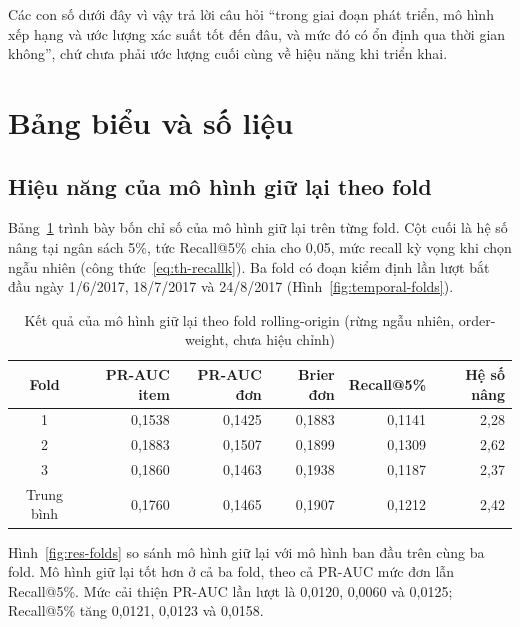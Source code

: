\documentclass[12pt,a4paper]{report}
\begin{document}
Các con số dưới đây vì vậy trả lời câu hỏi ``trong giai đoạn phát triển, mô hình xếp hạng và ước lượng xác suất tốt đến đâu, và mức đó có ổn định qua thời gian không'', chứ chưa phải ước lượng cuối cùng về hiệu năng khi triển khai.

\section{Bảng biểu và số liệu}\label{sec:tables}

\subsection{Hiệu năng của mô hình giữ lại theo fold}\label{subsec:tab-folds}

Bảng~\ref{tab:res-folds} trình bày bốn chỉ số của mô hình giữ lại trên từng fold. Cột cuối là hệ số nâng tại ngân sách 5\%, tức Recall@5\% chia cho 0,05, mức recall kỳ vọng khi chọn ngẫu nhiên (công thức~\eqref{eq:th-recallk}). Ba fold có đoạn kiểm định lần lượt bắt đầu ngày 1/6/2017, 18/7/2017 và 24/8/2017 (Hình~\ref{fig:temporal-folds}).

\begin{table}[htbp]\centering\small
\caption{Kết quả của mô hình giữ lại theo fold rolling-origin (rừng ngẫu nhiên, order-weight, chưa hiệu chỉnh)}\label{tab:res-folds}
\begin{tabular}{crrrrr}
\toprule
Fold & PR-AUC item & PR-AUC đơn & Brier đơn & Recall@5\% & Hệ số nâng \\
\midrule
1 & 0,1538 & 0,1425 & 0,1883 & 0,1141 & 2,28 \\
2 & 0,1883 & 0,1507 & 0,1899 & 0,1309 & 2,62 \\
3 & 0,1860 & 0,1463 & 0,1938 & 0,1187 & 2,37 \\
\midrule
Trung bình & 0,1760 & 0,1465 & 0,1907 & 0,1212 & 2,42 \\
\bottomrule
\end{tabular}
\end{table}

Hình~\ref{fig:res-folds} so sánh mô hình giữ lại với mô hình ban đầu trên cùng ba fold. Mô hình giữ lại tốt hơn ở cả ba fold, theo cả PR-AUC mức đơn lẫn Recall@5\%. Mức cải thiện PR-AUC lần lượt là 0,0120, 0,0060 và 0,0125; Recall@5\% tăng 0,0121, 0,0123 và 0,0158.
\end{document}
